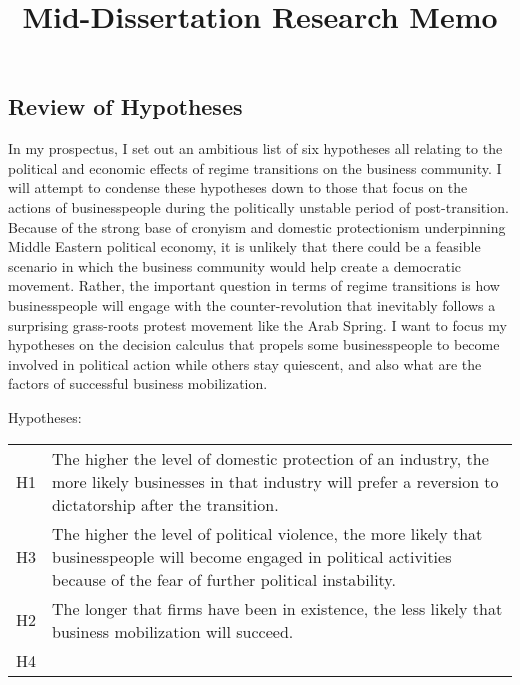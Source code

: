 

\title{Mid-Dissertation Research Memo}


	\maketitle
	
\subsection*{Review of Hypotheses}

In my prospectus, I set out an ambitious list of six hypotheses all relating to the political and economic effects of regime transitions on the business community. I will attempt to condense these hypotheses down to those that focus on the actions of businesspeople during the politically unstable period of post-transition. Because of the strong base of cronyism and domestic protectionism underpinning Middle Eastern political economy, it is unlikely that there could be a feasible scenario in which the business community would help create a democratic movement. Rather, the important question in terms of regime transitions is how businesspeople will engage with the counter-revolution that inevitably follows a surprising grass-roots protest movement like the Arab Spring. I want to focus my hypotheses on the decision calculus that propels some businesspeople to become involved in political action while others stay quiescent, and also what are the factors of successful business mobilization.

Hypotheses:

\begin{tabular}{l p{7cm}} 
	H1 & The higher the level of domestic protection of an industry, the more likely businesses in that industry will prefer a reversion to dictatorship after the transition. \\
	H3 & The higher the level of political violence, the more likely that businesspeople will become engaged in political activities because of the fear of further political instability.  \\
	H2 & The longer that firms have been in existence, the less likely that business mobilization will succeed. \\
	H4 & 
\end{tabular}
